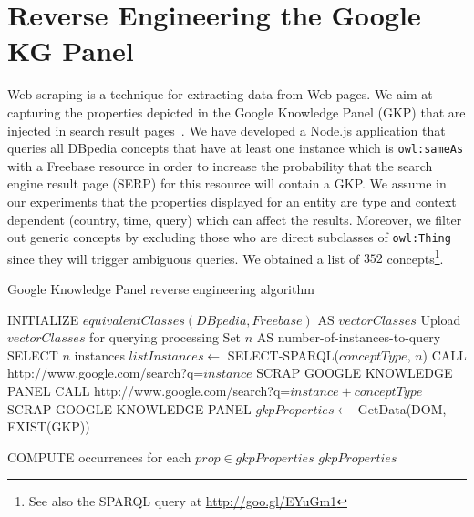 \documentclass[runningheads,a4paper]{../../Util/LaTEX/llncs}
\begin{document}
\section{Reverse Engineering the Google KG Panel}
\label{sec:knowledge-graph}
Web scraping is a technique for extracting data from Web pages. We aim at capturing the properties depicted in the Google Knowledge Panel (GKP) that are injected in search result pages~\cite{Bergman:GKG:12}. We have developed a Node.js application that queries all DBpedia concepts that have at least one instance which is \texttt{owl:sameAs} with a Freebase resource in order to increase the probability that the search engine result page (SERP) for this resource will contain a GKP. We assume in our experiments that the properties displayed for an entity are type and context dependent (country, time, query) which can affect the results. Moreover, we filter out generic concepts by excluding those who are direct subclasses of \texttt{owl:Thing} since they will trigger ambiguous queries. We obtained a list of $352$ concepts\footnote{See also the SPARQL query at \url{http://goo.gl/EYuGm1}}.
\begin{algorithm}[h]\scriptsize
\caption{Google Knowledge Panel reverse engineering algorithm} \label{algoscrapping}
\begin{algorithmic}[1]
    \STATE INITIALIZE $equivalentClasses(DBpedia,Freebase) $ AS $vectorClasses$
    \STATE Upload $vectorClasses$ for querying processing
    \STATE Set $n$ AS number-of-instances-to-query
	\STATE SELECT $n$ instances
	\STATE $listInstances \leftarrow$ SELECT-SPARQL($conceptType$, $n$)
			\STATE CALL http://www.google.com/search?q=$instance$
				\STATE SCRAP GOOGLE KNOWLEDGE PANEL
			\ELSE
				\STATE CALL http://www.google.com/search?q=$instance + conceptType$
 				\STATE SCRAP GOOGLE KNOWLEDGE PANEL
			\ENDIF
			\STATE $gkpProperties \leftarrow$ GetData(DOM, EXIST(GKP))

		\ENDFOR
	\STATE COMPUTE occurrences for each $prop \in gkpProperties$
    \ENDFOR
    \RETURN $gkpProperties$
\end{algorithmic}
\end{algorithm}
\normalsize
\end{document}
